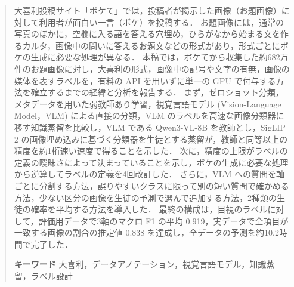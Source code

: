 \begin{abstract}
大喜利投稿サイト「ボケて」では，投稿者が掲示した画像（お題画像）に対して利用者が面白い一言（ボケ）を投稿する．
お題画像には，通常の写真のほかに，空欄に入る語を答える穴埋め，ひらがなから始まる文を作るカルタ，画像中の問いに答えるお題文などの形式があり，形式ごとにボケの生成に必要な処理が異なる．
本稿では，ボケてから収集した約682万件のお題画像に対し，大喜利の形式，画像中の記号や文字の有無，画像の媒体を表すラベルを，有料の API を用いずに単一の GPU で付与する方法を確立するまでの経緯と分析を報告する．
まず，ゼロショット分類，メタデータを用いた弱教師あり学習，視覚言語モデル (Vision-Language Model，VLM) による直接の分類，VLM のラベルを高速な画像分類器に移す知識蒸留を比較し，VLM である Qwen3-VL-8B を教師とし，SigLIP 2 の画像埋め込みに基づく分類器を生徒とする蒸留が，教師と同等以上の精度を約1桁速い速度で得ることを示した．
次に，精度の上限がラベルの定義の曖昧さによって決まっていることを示し，ボケの生成に必要な処理から逆算してラベルの定義を4回改訂した．
さらに，VLM への質問を軸ごとに分割する方法，誤りやすいクラスに限って別の短い質問で確かめる方法，少ない区分の画像を生徒の予測で選んで追加する方法，2種類の生徒の確率を平均する方法を導入した．
最終の構成は，目視のラベルに対して，評価用データで3軸のマクロ F1 の平均 0.919，実データで全項目が一致する画像の割合の推定値 0.838 を達成し，全データの予測を約10.2時間で完了した．
\par
\noindent
{\bf キーワード} 大喜利，データアノテーション，視覚言語モデル，知識蒸留，ラベル設計
\end{abstract}


